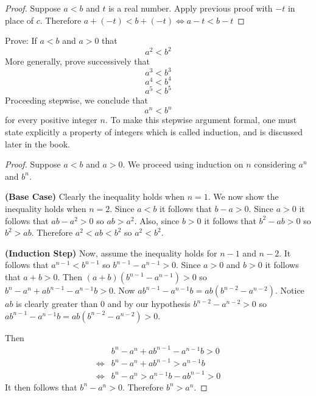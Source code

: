 \begin{proof}
    Suppose $a < b$ and $t$ is a real number.
    Apply previous proof with $-t$ in place of $c$.
    Therefore $a + (-t) < b + (-t) \iff a - t < b - t$
\end{proof}

\newpage
\begin{tcolorbox}[title=Problem 6, breakable]
    Prove: If $a < b$ and $a > 0$ that 
    \[a^2 < b^2\]
    More generally, prove successively that
    \[a^3 < b^3\]
    \[a^4 < b^4\]
    \[a^5 < b^5\]
    Proceeding stepwise, we conclude that 
    \[a^n < b^n\]
    for every positive integer $n$. To make this stepwise argument formal,
    one must state explicitly a property of integers which is called induction,
    and is discussed later in the book.
\end{tcolorbox}

\begin{proof}
    Suppose $a < b$ and $a > 0$. We proceed using induction 
        on $n$ considering $a^n$ and $b^n$.

    \textbf{(Base Case)} Clearly the inequality holds when $n = 1$.
    We now show the inequality holds when $n = 2$. Since $a < b$ it follows that $b - a > 0$.
    Since $a > 0$ it follows that $ab - a^2 > 0$ so $ab > a^2$.
    Also, since $b > 0$ it follows that $b^2 - ab > 0$ so $b^2 > ab$.
    Therefore $a^2 < ab < b^2$ so $a^2 < b^2$.

    \textbf{(Induction Step)} 
    Now, assume the inequality holds for $n - 1$ and $n - 2$.
    It follows that $a^{n - 1} < b^{n - 1}$ so $b^{n - 1} - a^{n - 1} > 0$.
    Since $a > 0$ and $b > 0$ it follows that $a + b > 0$.
    Then $(a + b)(b^{n - 1} - a^{n - 1}) > 0$ so $b^n - a^n + ab^{n - 1} - a^{n - 1}b > 0$.
    Now $ab^{n - 1} - a^{n - 1}b = ab(b^{n - 2} - a^{n - 2})$. 
    Notice $ab$ is clearly greater than $0$ and by our hypothesis $b^{n - 2} - a^{n - 2} > 0$
        so $ab^{n - 1} - a^{n - 1}b = ab(b^{n - 2} - a^{n - 2}) > 0$.

    Then
    \begin{align*}
        &b^n - a^n + ab^{n - 1} - a^{n - 1}b > 0  \\
        \iff &b^n - a^n + ab^{n - 1} > a^{n - 1}b \\
        \iff &b^n - a^n > a^{n - 1}b - ab^{n - 1} > 0
    \end{align*}
    It then follows that $b^n - a^n > 0$.
    Therefore $b^n > a^n$.
\end{proof}

